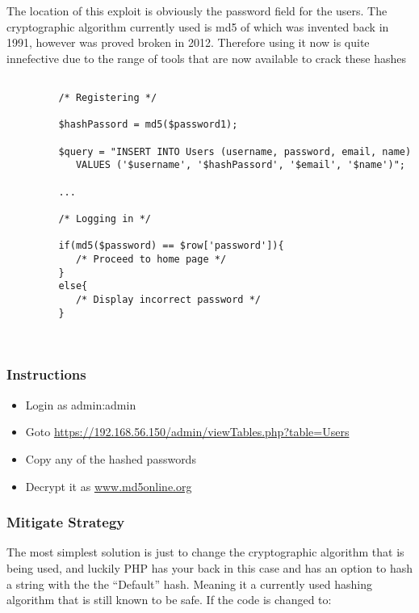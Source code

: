 \documentclass[titlepage]{article}
\begin{document}
      The location of this exploit is obviously the password field for the users. The cryptographic algorithm currently used is md5 of which was invented back in 1991, however was proved broken in 2012. Therefore using it now is quite innefective due to the range of tools that are now available to crack these hashes

      \begin{lstlisting}
            
         /* Registering */

         $hashPassord = md5($password1);

         $query = "INSERT INTO Users (username, password, email, name) 
            VALUES ('$username', '$hashPassord', '$email', '$name')";

         ... 

         /* Logging in */

         if(md5($password) == $row['password']){
            /* Proceed to home page */
         }
         else{
            /* Display incorrect password */
         }
            


      \end{lstlisting}


      \subsubsection{Instructions} %
      \label{ssub:instructions}
      
      \begin{itemize}
         \item Login as admin:admin
         \item Goto \url{https://192.168.56.150/admin/viewTables.php?table=Users}
         \item Copy any of the hashed passwords
         \item Decrypt it as \url{www.md5online.org}
      \end{itemize}


      \subsubsection{Mitigate Strategy} %
      \label{ssub:mitigate_strategy}
      
      The most simplest solution is just to change the cryptographic algorithm that is being used, and luckily PHP has your back in this case and has an option to hash a string with the the ``Default'' hash. Meaning it a currently used hashing algorithm that is still known to be safe. If the code is changed to:
\end{document}

